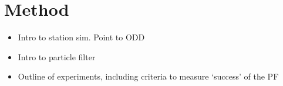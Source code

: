 \section{Method\label{Method}}

\begin{itemize}
\item Intro to station sim. Point to ODD
\item Intro to particle filter
\item Outline of experiments, including criteria to measure `success' of the PF
\end{itemize}
